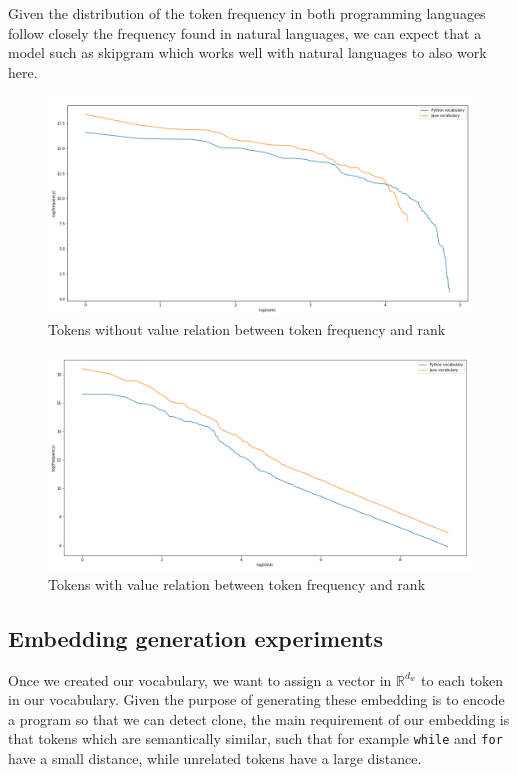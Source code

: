 Given the distribution of the token frequency in both programming languages
follow closely the frequency found in natural languages, we can expect that a
model such as skipgram which works well with natural languages to also work
here.

\begin{figure}
  \centering\includegraphics[width=14cm]{images/distribution-without-values.png}
  \caption{\label{fig:no-values-vocabulary-distribution}Tokens without value
    relation between token frequency and rank}
\end{figure}

\begin{figure}
  \centering\includegraphics[width=14cm]{images/distribution-with-values.png}
  \caption{\label{fig:with-values-vocabulary-distribution}Tokens with value
    relation between token frequency and rank}
\end{figure}

\subsection{Embedding generation experiments}
Once we created our vocabulary, we want to assign a vector in $\mathbb{R}^{d_w}$
to each token in our vocabulary. Given the purpose of generating these embedding
is to encode a program so that we can detect clone, the main requirement of our
embedding is that tokens which are semantically similar, such that for example
\lstinline{while} and \lstinline{for} have a small distance, while unrelated
tokens have a large distance.

